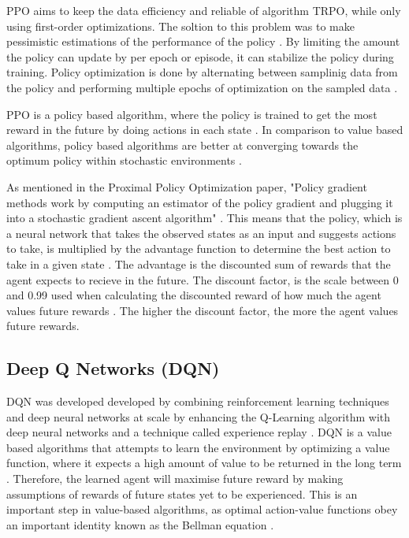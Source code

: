PPO aims to keep the data efficiency and reliable of algorithm TRPO, while only using first-order optimizations. The soltion to this problem was to make pessimistic estimations of the performance of the policy \cite{schulman2017proximal}. By limiting the amount the policy can update by per epoch or episode, it can stabilize the policy during training. Policy optimization is done by alternating between samplinig data from the policy and performing multiple epochs of optimization on the sampled data \cite{schulman2017proximal}. 

PPO is a policy based algorithm, where the policy is trained to get the most reward in the future by doing actions in each state \cite{deepcheckRL}. In comparison to value based algorithms, policy based algorithms are better at converging towards the optimum policy within stochastic environments \cite{mnih2015human}. 

As mentioned in the Proximal Policy Optimization paper, "Policy gradient methods work by computing an estimator of the policy gradient and plugging it into a stochastic gradient ascent algorithm" \cite{schulman2017proximal}. This means that the policy, which is a neural network that takes the observed states as an input and suggests actions to take, is multiplied by the advantage function to determine the best action to take in a given state \cite{schulman2017proximal}. The advantage is the discounted sum of rewards that the agent expects to recieve in the future. The discount factor, is the scale between 0 and 0.99 used when calculating the discounted reward of how much the agent values future rewards \cite{XanderSteenbrugge2019ppo}. The higher the discount factor, the more the agent values future rewards. 

\subsection{Deep Q Networks (DQN)}

DQN was developed developed by combining reinforcement learning techniques and deep neural networks at scale by enhancing the Q-Learning algorithm with deep neural networks and a technique called experience replay \cite{TFAgentsAuthors2023}. DQN is a value based algorithms that attempts to learn the environment by optimizing a value function, where it expects a high amount of value to be returned in the long term \cite{deepcheckRL}. Therefore, the learned agent will maximise future reward by making assumptions of rewards of future states yet to be experienced. This is an important step in value-based algorithms, as optimal action-value functions obey an important identity known as the Bellman equation \cite{mnih2013playing}. 

